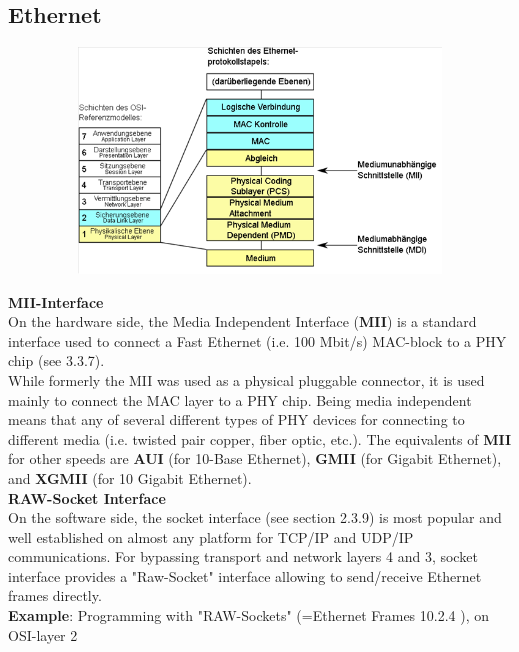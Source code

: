 \subsection{ Ethernet }

    \begin{figure}[h]
    \centering
    \includegraphics[width=12cm, height=6cm]{Images/image56.png}
    \label{fig:Fig }
    \end{figure}

{\rot\bf MII-Interface }\\

On the hardware side, the Media Independent Interface (\textbf{MII}) is a standard interface used to connect a Fast Ethernet (i.e. 100 Mbit/s) MAC-block to a PHY chip (see 3.3.7). \\

While formerly the MII was used as a physical pluggable connector, it is used mainly to connect the MAC layer to a PHY chip. Being media independent means that any of several different types of PHY devices for connecting to different media (i.e. twisted pair copper, fiber optic, etc.). The equivalents of \textbf{MII} for other speeds are \textbf{AUI} (for 10-Base Ethernet), \textbf{GMII} (for Gigabit Ethernet), and \textbf{XGMII} (for 10 Gigabit Ethernet).\\

{\rot\bf RAW-Socket Interface}\\

On the software side, the socket interface (see section 2.3.9) is most popular and well established on almost any platform for TCP/IP and UDP/IP communications. For bypassing transport and network layers 4 and 3, socket interface provides  a "Raw-Socket" interface allowing to send/receive Ethernet frames directly.\\

\textbf{Example}: Programming with "RAW-Sockets" (=Ethernet Frames 10.2.4 ), on OSI-layer 2

